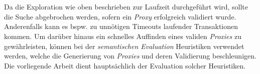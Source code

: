 \\\\
Da die Exploration wie oben beschrieben zur Laufzeit durchgeführt wird, sollte die Suche abgebrochen werden, sofern ein \emph{Proxy} erfolgreich validiert wurde. Anderenfalls kann es bspw. zu unnötigen Timeouts laufender Transaktionen kommen. Um darüber hinaus ein schnelles Auffinden eines validen \emph{Proxies} zu gewährleisten, können bei der \emph{semantischen Evaluation} Heuristiken verwendet werden, welche die Generierung von \emph{Proxies} und deren Validierung beschleunigen. Die vorliegende Arbeit dient hauptsächlich der Evaluation solcher Heuristiken.
